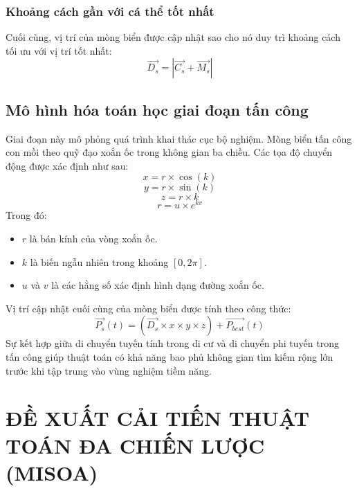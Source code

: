\documentclass[12pt, a4paper]{article}
\begin{document}
\subsubsection{Khoảng cách gần với cá thể tốt nhất}
Cuối cùng, vị trí của mòng biển được cập nhật sao cho nó duy trì khoảng cách tối ưu với vị trí tốt nhất:
\begin{equation}
    \vec{D_s} = |\vec{C_s} + \vec{M_s}|
\end{equation}

\subsection{Mô hình hóa toán học giai đoạn tấn công}
Giai đoạn này mô phỏng quá trình khai thác cục bộ nghiệm. Mòng biển tấn công con mồi theo quỹ đạo xoắn ốc trong không gian ba chiều. Các tọa độ chuyển động được xác định như sau:
\begin{equation}
    x = r \times \cos(k)
\end{equation}
\begin{equation}
    y = r \times \sin(k)
\end{equation}
\begin{equation}
    z = r \times k
\end{equation}
\begin{equation}
    r = u \times e^{kv}
\end{equation}
Trong đó:
\begin{itemize}
    \item $r$ là bán kính của vòng xoắn ốc.
    \item $k$ là biến ngẫu nhiên trong khoảng $[0, 2\pi]$.
    \item $u$ và $v$ là các hằng số xác định hình dạng đường xoắn ốc.
\end{itemize}
Vị trí cập nhật cuối cùng của mòng biển được tính theo công thức:
\begin{equation}
    \vec{P_s}(t) = (\vec{D_s} \times x \times y \times z) + \vec{P_{best}}(t)
\end{equation}
Sự kết hợp giữa di chuyển tuyến tính trong di cư và di chuyển phi tuyến trong tấn công giúp thuật toán có khả năng bao phủ không gian tìm kiếm rộng lớn trước khi tập trung vào vùng nghiệm tiềm năng.

\newpage
\section{ĐỀ XUẤT CẢI TIẾN THUẬT TOÁN ĐA CHIẾN LƯỢC (MISOA)}
\end{document}
